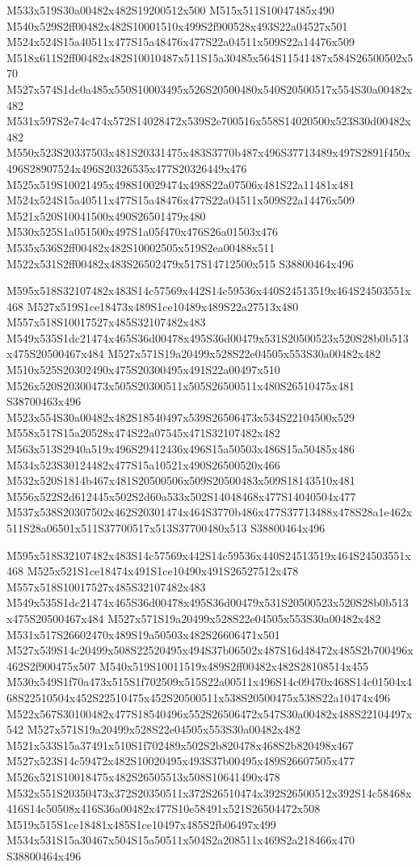 \documentclass{article}
\begin{document}
\begin{multicols}{2}
M533x519S30a00482x482S19200512x500 M515x511S10047485x490 M540x529S2ff00482x482S10001510x499S2f900528x493S22a04527x501 M524x524S15a40511x477S15a48476x477S22a04511x509S22a14476x509 M518x611S2ff00482x482S10010487x511S15a30485x564S11541487x584S26500502x570 M527x574S1dc0a485x550S10003495x526S20500480x540S20500517x554S30a00482x482 M531x597S2e74c474x572S14028472x539S2e700516x558S14020500x523S30d00482x482 M550x523S20337503x481S20331475x483S3770b487x496S37713489x497S2891f450x496S28907524x496S20326535x477S20326449x476 M525x519S10021495x498S10029474x498S22a07506x481S22a11481x481 M524x524S15a40511x477S15a48476x477S22a04511x509S22a14476x509 M521x520S10041500x490S26501479x480 M530x525S1a051500x497S1a05f470x476S26a01503x476 M535x536S2ff00482x482S10002505x519S2ea00488x511 M522x531S2ff00482x483S26502479x517S14712500x515 S38800464x496

M595x518S32107482x483S14c57569x442S14c59536x440S24513519x464S24503551x468 M527x519S1ce18473x489S1ce10489x489S22a27513x480 M557x518S10017527x485S32107482x483 M549x535S1dc21474x465S36d00478x495S36d00479x531S20500523x520S28b0b513x475S20500467x484 M527x571S19a20499x528S22e04505x553S30a00482x482 M510x525S20302490x475S20300495x491S22a00497x510 M526x520S20300473x505S20300511x505S26500511x480S26510475x481 S38700463x496 M523x554S30a00482x482S18540497x539S26506473x534S22104500x529 M558x517S15a20528x474S22a07545x471S32107482x482 M563x513S2940a519x496S29412436x496S15a50503x486S15a50485x486 M534x523S30124482x477S15a10521x490S26500520x466 M532x520S1814b467x481S20500506x509S20500483x509S18143510x481 M556x522S2d612445x502S2d60a533x502S14048468x477S14040504x477 M537x538S20307502x462S20301474x464S3770b486x477S37713488x478S28a1e462x511S28a06501x511S37700517x513S37700480x513 S38800464x496

M595x518S32107482x483S14c57569x442S14c59536x440S24513519x464S24503551x468 M525x521S1ce18474x491S1ce10490x491S26527512x478 M557x518S10017527x485S32107482x483 M549x535S1dc21474x465S36d00478x495S36d00479x531S20500523x520S28b0b513x475S20500467x484 M527x571S19a20499x528S22e04505x553S30a00482x482 M531x517S26602470x489S19a50503x482S26606471x501 M527x539S14c20499x508S22520495x494S37b06502x487S16d48472x485S2b700496x462S2f900475x507 M540x519S10011519x489S2ff00482x482S28108514x455 M530x549S1f70a473x515S1f702509x515S22a00511x496S14c09470x468S14c01504x468S22510504x452S22510475x452S20500511x538S20500475x538S22a10474x496 M522x567S30100482x477S18540496x552S26506472x547S30a00482x488S22104497x542 M527x571S19a20499x528S22e04505x553S30a00482x482 M521x533S15a37491x510S1f702489x502S2b820478x468S2b820498x467 M527x523S14c59472x482S10020495x493S37b00495x489S26607505x477 M526x521S10018475x482S26505513x508S10641490x478 M532x551S20350473x372S20350511x372S26510474x392S26500512x392S14c58468x416S14c50508x416S36a00482x477S10e58491x521S26504472x508 M519x515S1ce18481x485S1ce10497x485S2fb06497x499 M534x531S15a30467x504S15a50511x504S2a208511x469S2a218466x470 S38800464x496


\end{multicols}
\end{document}
